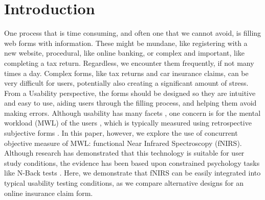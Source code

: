 \documentclass[../main/Feedback.tex]{subfiles}
\begin{document}
\section{Introduction}
One process that is time consuming, and often one that we cannot avoid, is filling web forms with information.
These might be mundane, like registering with a new website, procedural, like online banking, or complex and important, like completing a tax return. Regardless, we encounter them frequently, if not many times a day. Complex forms, like tax returns and car insurance claims, can be very difficult for users, potentially also creating a significant amount of stress.
From a Usability perspective, the forms should be designed so they are intuitive and easy to use, aiding users through the filling process, and helping them avoid making errors. Although usability has many facets \cite{bevan2001international}, one concern is for the mental workload (MWL) of the users \cite{bevan1997methods}, which is typically measured using retrospective subjective forms \cite{nasatlx}. In this paper, however, we explore the use of concurrent objective measure of MWL: functional Near Infrared Spectroscopy (fNIRS). Although research has demonstrated that this technology is suitable for user study conditions, the evidence has been based upon constrained psychology tasks like N-Back tests \cite{ayaz2007detecting,herff2013mental,molteni2008activation}. Here, we demonstrate that fNIRS can be easily integrated into typical usability testing conditions, as we compare alternative designs for an online insurance claim form.
\end{document}
